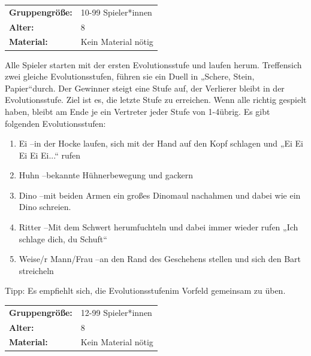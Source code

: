 \begin{table}[H]
\begin{tabular}{>{\bfseries}lp{8cm}}
   Gruppengröße:   & 10-99 Spieler*innen\\
    Alter: & 8 \\
    Material: & Kein Material nötig \\
\end{tabular}
\end{table} 

    Alle Spieler starten mit der ersten Evolutionsstufe und laufen herum. Treffensich zwei gleiche Evolutionsstufen, führen sie ein Duell in „Schere, Stein, Papier“durch. Der Gewinner steigt eine Stufe auf, der Verlierer bleibt in der Evolutionsstufe. Ziel ist es, die letzte Stufe zu erreichen. Wenn alle richtig gespielt haben, bleibt am Ende je ein Vertreter jeder Stufe von 1-4übrig. Es gibt folgenden Evolutionsstufen:
    \begin{enumerate}
        \item Ei –in der Hocke laufen, sich mit der Hand auf den Kopf schlagen und „Ei  Ei Ei Ei Ei...“ rufen
        \item Huhn –bekannte Hühnerbewegung und gackern
        \item Dino –mit beiden Armen ein großes Dinomaul nachahmen und dabei wie ein Dino schreien. 
        \item Ritter –Mit dem Schwert herumfuchteln und dabei immer wieder rufen „Ich schlage dich, du Schuft“
        \item Weise/r Mann/Frau –an den Rand des Geschehens stellen und sich den Bart streicheln
        
    \end{enumerate}
    Tipp: Es empfiehlt sich, die Evolutionsstufenim Vorfeld gemeinsam zu üben.





\begin{table}[H]
\begin{tabular}{>{\bfseries}lp{8cm}}
  Gruppengröße:   & 12-99 Spieler*innen\\
    Alter: & 8 \\
    Material: & Kein Material nötig \\ 
\end{tabular}
\end{table} 


